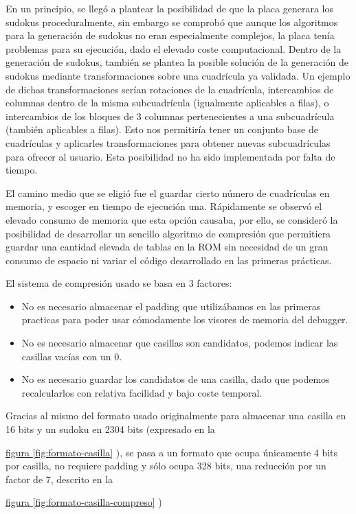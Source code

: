 \documentclass[12pt,letterpaper]{article}
\newcommand*{\iref}[2]{
  \hyperref[#1]{#2
  \ref*{#1}}
  }
\begin{document}
En un principio, se llegó a plantear la posibilidad de que la placa
generara los sudokus proceduralmente, sin embargo se comprobó que
aunque los algoritmos para la generación de sudokus no eran
especialmente complejos, la placa tenía problemas para su ejecución,
dado el elevado coste computacional. Dentro de la generación de
sudokus, también se plantea la posible solución de la generación de
sudokus mediante transformaciones sobre una cuadrícula ya validada. Un
ejemplo de dichas transformaciones serían rotaciones de la cuadrícula,
intercambios de columnas dentro de la misma subcuadrícula (igualmente
aplicables a filas), o intercambios de los bloques de 3 columnas
pertenecientes a una subcuadrícula (también aplicables a filas). Esto
nos permitiría tener un conjunto base de cuadrículas y aplicarles
transformaciones para obtener nuevas subcuadrículas para ofrecer al
usuario. Esta posibilidad no ha sido implementada por falta de tiempo.

El camino medio que se eligió fue el guardar cierto número de
cuadrículas en memoria, y escoger en tiempo de ejecución
una. Rápidamente se observó el elevado consumo de memoria que esta
opción causaba, por ello, se consideró la posibilidad de desarrollar
un sencillo algoritmo de compresión que permitiera guardar una
cantidad elevada de tablas en la ROM sin necesidad de un gran consumo
de espacio ni variar el código desarrollado en las primeras prácticas.

El sistema de compresión usado se basa en 3 factores:
\begin{itemize}
  \item No es necesario almacenar el padding que utilizábamos en las
    primeras practicas para poder usar cómodamente los visores de
    memoria del debugger.
  \item No es necesario almacenar que casillas son candidatos, podemos
    indicar las casillas vacías con un 0.
  \item No es necesario guardar los candidatos de una casilla, dado
    que podemos recalcularlos con relativa facilidad y bajo coste
    temporal.
\end{itemize}

Gracias al mismo del formato usado originalmente para almacenar una
casilla en 16 bits y un sudoku en 2304 bits (expresado en la
\iref{fig:formato-casilla}{figura}), se pasa a un formato que ocupa
únicamente 4 bits por casilla, no requiere padding y sólo ocupa 328
bits, una reducción por un factor de 7, descrito en la
\iref{fig:formato-casilla-compreso}{figura})
\end{document}
